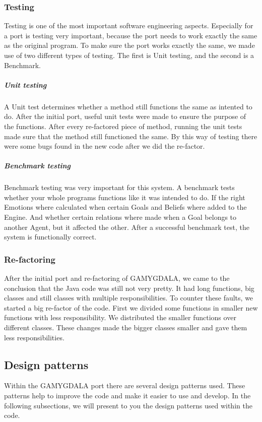 \subsubsection{Testing}
Testing is one of the most important software engineering aspects. Especially for a port is testing very important, because the port needs to work exactly the same as the original program. To make sure the port works exactly the same, we made use of two different types of testing. The first is Unit testing, and the second is a Benchmark.

	\subparagraph{Unit testing}
A Unit test determines whether a method still functions the same as intented to do. After the initial port, useful unit tests were made to ensure the purpose of the functions. After every re-factored piece of method, running the unit tests made sure that the method still functioned the same. By this way of testing there were some bugs found in the new code after we did the re-factor.

	\subparagraph{Benchmark testing}
Benchmark testing was very important for this system. A benchmark tests whether your whole programs functions like it was intended to do. If the right Emotions where calculated when certain Goals and Beliefs where added to the Engine. And whether certain relations where made when a Goal belongs to another Agent, but it affected the other. After a successful benchmark test, the system is functionally correct. 

\subsubsection{Re-factoring}
After the initial port and re-factoring of GAMYGDALA, we came to the conclusion that the Java code was still not very pretty. It had long functions, big classes and still classes with multiple responsibilities. To counter these faults, we started a big re-factor of the code. First we divided some functions in smaller new functions with less responsibility. We distributed the smaller functions over different classes. These changes made the bigger classes smaller and gave them less responsibilities.  

\subsection{Design patterns}
Within the GAMYGDALA port there are several design patterns used. These patterns help to improve the code and make it easier to use and develop. In the following subsections, we will present to you the design patterns used within the code.

